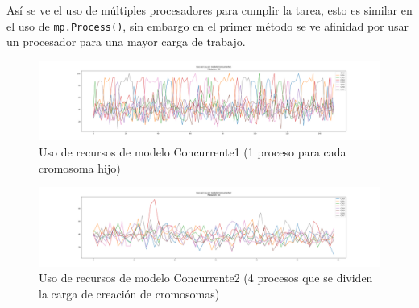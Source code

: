 \documentclass[a4paper,twocolumn,10pt]{article}
\begin{document}
Así se ve el uso de múltiples procesadores para cumplir la tarea, esto es similar en el uso de \verb|mp.Process()|, sin embargo en el primer método se ve afinidad por usar un procesador para una mayor carga de trabajo.
\begin{figure}[H]
    \centering
    \includegraphics[width=\linewidth]{Plots/ModeloConcurrente1_Poblacion50.png}
    \caption{Uso de recursos de modelo Concurrente1 (1 proceso para cada cromosoma hijo)}
\end{figure}
\begin{figure}[H]
    \centering
    \includegraphics[width=\linewidth]{Plots/ModeloConcurrente2_Poblacion50.png}
    \caption{Uso de recursos de modelo Concurrente2 (4 procesos que se dividen la carga de creación de cromosomas)}
\end{figure}
\end{document}
